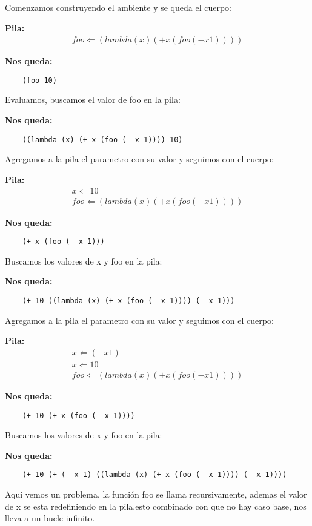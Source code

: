 Comenzamos construyendo el ambiente y se queda el cuerpo: \vspace{.3cm}

\textbf{Pila:}
\[
\begin{array}{c}
  foo \Leftarrow (lambda (x) (+ x (foo (- x 1))))
\end{array}
\]

\textbf{Nos queda:}
\begin{verbatim}
    (foo 10)
\end{verbatim}

Evaluamos, buscamos el valor de foo en la pila:

\textbf{Nos queda:}
\begin{verbatim}
    ((lambda (x) (+ x (foo (- x 1)))) 10)
\end{verbatim}

Agregamos a la pila el parametro con su valor y seguimos con el cuerpo:\vspace{.3cm}

\textbf{Pila:} 
\[
\begin{array}{c}
    x \Leftarrow 10 \\
    foo \Leftarrow (lambda (x) (+ x (foo (- x 1))))
\end{array}
\]

\textbf{Nos queda:}
\begin{verbatim}
    (+ x (foo (- x 1)))
\end{verbatim}

Buscamos los valores de x y foo en la pila: \vspace{.3cm}

\textbf{Nos queda:}
\begin{verbatim}
    (+ 10 ((lambda (x) (+ x (foo (- x 1)))) (- x 1)))
\end{verbatim}

Agregamos a la pila el parametro con su valor y seguimos con el cuerpo:\vspace{.3cm}

\textbf{Pila:}
\[
\begin{array}{c}
    x \Leftarrow (- x 1) \\
    x \Leftarrow 10 \\
    foo \Leftarrow (lambda (x) (+ x (foo (- x 1))))
\end{array}
\]

\textbf{Nos queda:}
\begin{verbatim}
    (+ 10 (+ x (foo (- x 1))))
\end{verbatim}

Buscamos los valores de x y foo en la pila: \vspace{.3cm}

\textbf{Nos queda:}
\begin{verbatim}
    (+ 10 (+ (- x 1) ((lambda (x) (+ x (foo (- x 1)))) (- x 1))))
\end{verbatim}

Aqui vemos un problema, la función foo se llama recursivamente, 
ademas el valor de x se esta redefiniendo en la pila,esto combinado
con que no hay caso base, nos lleva a un bucle infinito.